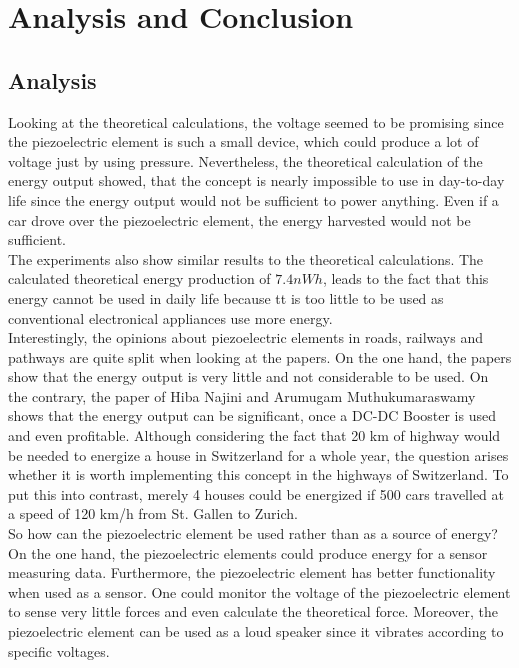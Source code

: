 \chapter{Analysis and Conclusion}

\section{Analysis}

Looking at the theoretical calculations, the voltage seemed to be promising since the piezoelectric element is such a small device, which could produce a lot of voltage just by using pressure. Nevertheless, the theoretical calculation of the energy output showed, that the concept is nearly impossible to use in day-to-day life since the energy output would not be sufficient to power anything. Even if a car drove over the piezoelectric element, the energy harvested would not be sufficient. \\ 
The experiments also show similar results to the theoretical calculations. The calculated theoretical energy production of $7.4nWh$, leads to the fact that this energy cannot be used in daily life because tt is too little to be used as conventional electronical appliances use more energy.\\
Interestingly, the opinions about piezoelectric elements in roads, railways and pathways are quite split when looking at the papers. On the one hand, the papers show that the energy output is very little and not considerable to be used. On the contrary, the paper of Hiba Najini and Arumugam Muthukumaraswamy shows that the energy output can be significant, once a DC-DC  Booster is used and even profitable. Although considering the fact that 20 km of highway would be needed to energize a house in Switzerland for a whole year, the question arises whether it is worth implementing this concept in the highways of Switzerland. To put this into contrast, merely 4 houses could be energized if 500 cars travelled at a speed of 120 km/h from St. Gallen to Zurich.\\
So how can the piezoelectric element be used rather than as a source of energy? On the one hand, the piezoelectric elements could produce energy for a sensor measuring data. Furthermore, the piezoelectric element has better functionality when used as a sensor. One could monitor the voltage of the piezoelectric element to sense very little forces and even calculate the theoretical force. Moreover, the piezoelectric element can be used as a loud speaker since it vibrates according to specific voltages.\\